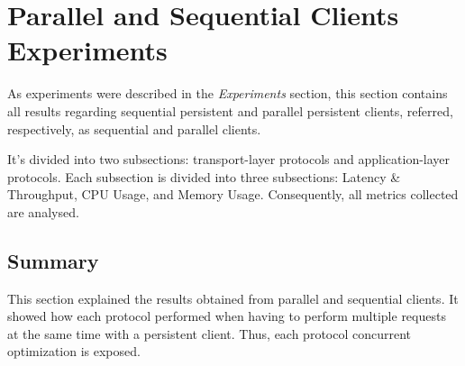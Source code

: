 \section{Parallel and Sequential Clients Experiments}

As experiments were described in the \textit{Experiments} section, this section contains all results regarding sequential persistent and parallel persistent clients, referred, respectively, as sequential and parallel clients.

It's divided into two subsections: transport-layer protocols and application-layer protocols. Each subsection is divided into three subsections: Latency \& Throughput, CPU Usage, and Memory Usage. Consequently, all metrics collected are analysed.





\subsection{Summary}

This section explained the results obtained from parallel and sequential clients. It showed how each protocol performed when having to perform multiple requests at the same time with a persistent client. Thus, each protocol concurrent optimization is exposed.
